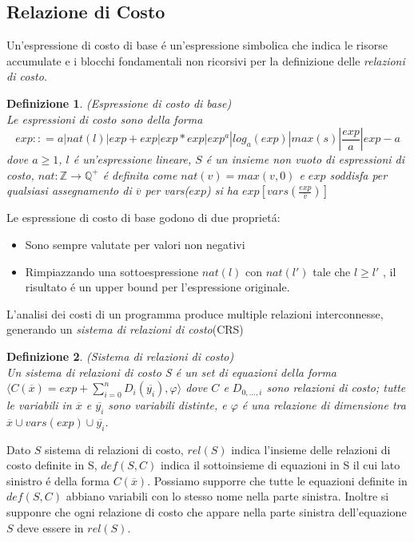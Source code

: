 \documentclass[../../main.tex]{subfiles}
\begin{document}
\subsection{Relazione di Costo} 
Un'espressione di costo di base é un'espressione simbolica che indica le risorse accumulate e i blocchi fondamentali non ricorsivi per la definizione delle \textit{relazioni di costo}.
\newtheorem{definition}{Definizione}
\begin{definition}(Espressione di costo di base)\\
Le espressioni di costo sono della forma $$exp :: = a | nat(l) | exp + exp | exp * exp |exp^a |log _a (exp) | max(s) | \frac{exp}{a} | exp - a   $$
dove $a \geq 1$, $l$ é un'espressione lineare, $S$ é un insieme non vuoto di espressioni di costo, $nat : \mathbb{Z}  \rightarrow \mathbb{Q} ^+$ é definita come $nat(v) = max({v,0})$ e $exp$ soddisfa per qualsiasi assegnamento di $\overline{v}$ per vars($exp$) si ha $exp[ vars(\frac{exp}{\overline{v}})]$
\end{definition}

Le espressione di costo di base godono di due proprietá:
\begin{itemize}
    \item Sono sempre valutate per valori non negativi
    \item Rimpiazzando una sottoespressione $nat(l)$ con $nat(l')$ tale che $l \geq l'$ , il risultato é un upper bound per l'espressione originale.
\end{itemize}
L'analisi dei costi di un programma produce multiple relazioni interconnesse, generando un \textit{sistema di relazioni di costo}(CRS)

\begin{definition}(Sistema di relazioni di costo)\\
    Un sistema di relazioni di costo S é un set di equazioni della forma $\langle C(\overline{x}) = exp + \sum_{i = 0}^n D_i(\overline{y_i}), \varphi \rangle$  dove $C$ e $D_{0,\dots, i}$ sono relazioni di costo; tutte le variabili in $\overline{x}$ e $\overline{y_i}$ sono variabili distinte, e $\varphi$ é una relazione di dimensione tra  $\overline{x} \cup vars(exp) \cup \overline{y_i}$.
\end{definition}

Dato $S$ sistema di relazioni di costo, $rel(S)$ indica l'insieme delle relazioni di costo definite in S, $def(S,C)$ indica il sottoinsieme di equazioni in S il cui lato sinistro é della forma $C(\overline{x})$.
Possiamo supporre che tutte le equazioni definite in $def(S,C)$ abbiano variabili con lo stesso nome nella parte sinistra.
Inoltre si supponre che ogni relazione di costo che appare nella parte sinistra dell'equazione $S$ deve essere in $rel(S)$.
\end{document}
